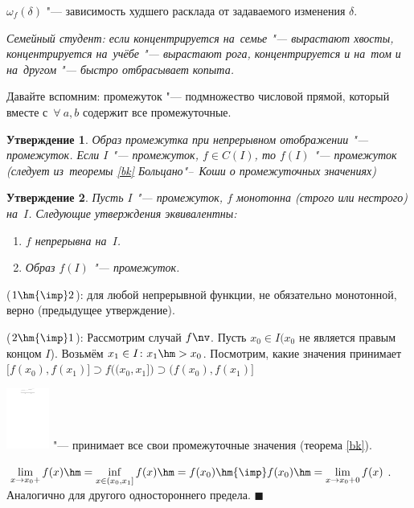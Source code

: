 \documentclass[a4paper,10pt,twoside]{article}
\newtheorem{Ut}{Утверждение}[section]
\newenvironment{Proof}
       {\par\noindent{\textbf{Доказательство.}}}
       {\hfill$\scriptstyle\blacksquare$}
\begin{document}
$\omega_f(\delta)$ "--- зависимость худшего расклада от задаваемого изменения $\delta$.

\textit{Семейный студент: если концентрируется на~семье "--- вырастают хвосты,
концентрируется на~учёбе "--- вырастают рога, концентрируется и на~том и на~другом "--- быстро отбрасывает копыта.}

Давайте вспомним: промежуток "--- подмножество числовой прямой, который вместе с~$\forall\  a,b$ содержит все промежуточные.

\begin{Ut}
Образ промежутка при непрерывном отображении "--- промежуток. Если $I$ "--- промежуток, $f\in C(I)$, то $f(I)$ "--- промежуток (следует из~теоремы \ref{bk} Больцано"--~Коши о промежуточных значениях)
\end{Ut}

\begin{Ut}
Пусть $I$ "--- промежуток, $f$ монотонна (строго или нестрого) на~$I$. Следующие утверждения эквивалентны:

\begin{enumerate}
    \item $f$ непрерывна на~$I$.

    \item Образ $f(I)$ "--- промежуток.
\end{enumerate}
\end{Ut}

\begin{Proof}
($1\hm{\imp}2$): для любой непрерывной функции, не обязательно монотонной, верно (предыдущее утверждение).

($2\hm{\imp}1$): Рассмотрим случай $f\nv$. Пусть $x_0\in I(x_0$ не является правым концом $I$). Возьмём $x_1\in I\colon
x_1\hm>x_0$. Посмотрим, какие значения принимает $\big[f(x_0),f(x_1)\big]\supset f\big((x_0,x_1]\big)\supset\big(f(x_0),f(x_1)\big]$

\includegraphics[height=2cm]{img/final/galat/Rasr/bk.pdf} "--- принимает все свои промежуточные значения (теорема \ref{bk}).

$\lim\limits_{x\to x_0+}f(x)\hm=\inf\limits_{x\in(x_0,x_1]}f(x)\hm=f(x_0)\hm{\imp} f(x_0)\hm=
\lim\limits_{x\to x_0+0}f(x)$. Аналогично для другого одностороннего предела.
\end{Proof}
\end{document}
